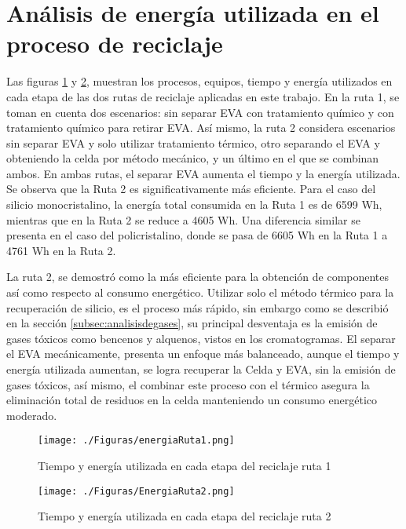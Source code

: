 \clearpage
 \section{Análisis de energía utilizada en el proceso de reciclaje}    
\label{sec:energiadelproceso}

Las figuras \ref{fig:energiaruta1} y \ref{fig:energiaruta2}, muestran los procesos, equipos, tiempo y energía utilizados en cada etapa de las dos rutas de reciclaje aplicadas en este trabajo. En la ruta 1, se toman en cuenta dos escenarios: sin separar EVA con tratamiento químico y con tratamiento químico para retirar EVA. Así mismo, la ruta 2 considera escenarios sin separar EVA y solo utilizar tratamiento térmico, otro separando el EVA y obteniendo la celda por método mecánico, y un último en el que se combinan ambos. En ambas rutas, el separar EVA aumenta el tiempo y la energía utilizada. Se observa que la Ruta 2 es significativamente más eficiente. Para el caso del silicio monocristalino, la energía total consumida en la Ruta 1 es de 6599 Wh, mientras que en la Ruta 2 se reduce a 4605 Wh. Una diferencia similar se presenta en el caso del policristalino, donde se pasa de 6605 Wh en la Ruta 1 a 4761 Wh en la Ruta 2. 

La ruta 2, se demostró como la más eficiente para la obtención de componentes así como respecto al consumo energético. Utilizar solo el método térmico para la recuperación de silicio, es el proceso más rápido, sin embargo como se describió en la sección \ref{subsec:analisisdegases}, su principal desventaja es la emisión de gases tóxicos como bencenos y alquenos, vistos en los cromatogramas. El separar el EVA mecánicamente, presenta un enfoque más balanceado, aunque el tiempo y energía utilizada aumentan, se logra recuperar la Celda y EVA, sin la emisión de gases tóxicos, así mismo, el combinar este proceso con el térmico asegura la eliminación total de residuos en la celda manteniendo un consumo energético moderado. 

\begin{figure}[htb]
	\begin{center}
		\texttt{[image: ./Figuras/energiaRuta1.png]}
	\end{center}
	\vspace{-1em} %
	\caption{Tiempo y energía utilizada en cada etapa del reciclaje ruta 1}
	\label{fig:energiaruta1}
\end{figure}

\begin{figure}[htb]
	\begin{center}
		\texttt{[image: ./Figuras/EnergiaRuta2.png]}
	\end{center}
	\vspace{-1em} %
	\caption{Tiempo y energía utilizada en cada etapa del reciclaje ruta 2}
	\label{fig:energiaruta2}
\end{figure}

